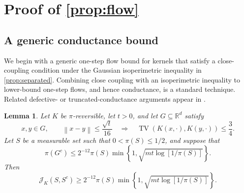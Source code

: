 \documentclass[11pt]{article}
\newtheorem{lemma}[lemma]{Lemma}
\newcommand{\R}{\mathbb R}
\newcommand{\TV}{\operatorname{TV}}
\newcommand{\norm}[1]{\left\lVert #1\right\rVert}
\newcommand{\1}{\mathbf 1}
\begin{document}
	\section{Proof of \cref{prop:flow}}\label{app:defective}
	
	
	\subsection{A generic conductance bound}
	
	We begin with a generic one-step flow bound for kernels that satisfy a
	close-coupling condition under the Gaussian isoperimetric inequality in
	\cref{prop:separated}.  Combining close coupling with an isoperimetric
	inequality to lower-bound one-step flows, and hence conductance, is a standard
	technique.  Related defective- or truncated-conductance arguments appear in
	\citet{DwivediEtAl2019,WuSchmidlerChen2022,ChenGatmiry2023,LiuTong2026}.
	
	\begin{lemma}\label{lem:defective}
		Let \(K\) be \(\pi\)-reversible, let \(t>0\), and let
		\(G\subseteq\R^d\) satisfy
		\[
		x,y\in G,\qquad \norm{x-y}\leq\frac{\sqrt{t}}{16}
		\quad\Longrightarrow\quad
		\TV(K(x,\cdot),K(y,\cdot))\leq\frac34.
		\]
		Let \(S\) be a measurable set such that \(0<\pi(S)\leq1/2\), and suppose that
		\begin{equation}\label{eq:defective-budget}
			\pi(G^c)
			\leq
			 2^{-12} \pi(S)
			\min\left\{1,\sqrt{mt\log[1/\pi(S)]}\right\}.
		\end{equation}
		Then
		\begin{equation}\label{eq:defective-flow}
			\mathcal{J}_K(S,S^c)
			\geq
			 2^{-12} \pi(S)
			\min\left\{1,\sqrt{mt\log[1/\pi(S)]}\right\}.
		\end{equation}
	\end{lemma}
	
\end{document}
